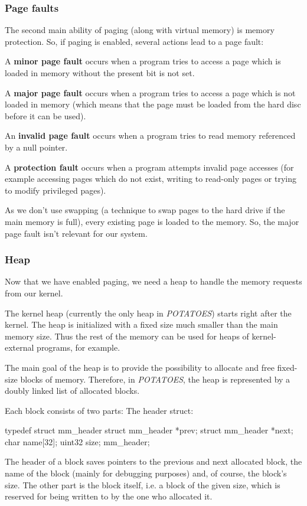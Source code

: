 \documentclass[11pt,a4paper]{scrartcl}
\begin{document}
\subsubsection{Page faults}
The second main ability of paging (along with virtual memory) is memory protection. So, if paging is enabled, several actions lead to a page fault:
\begin{list}{}{}
\item A \textbf{minor page fault} occurs when a program tries to access a page which is loaded in memory without the present bit is not set.
\item A \textbf{major page fault} occurs when a program tries to access a page which is not loaded in memory (which means that the page must be loaded from the hard disc before it can be used).
\item An \textbf{invalid page fault} occurs when a program tries to read memory referenced by a null pointer.
\item A \textbf{protection fault} occurs when a program attempts invalid page accesses (for example accessing pages which do not exist, writing to read-only pages or trying to modify privileged pages).
\end{list}
As we don't use swapping (a technique to swap pages to the hard drive if the main memory is full), every existing page is loaded to the memory. So, the major page fault isn't relevant for our system.
\subsubsection{Heap}
Now that we have enabled paging, we need a heap to handle the memory requests from our kernel.

The kernel heap (currently the only heap in \textit{POTATOES}) starts right after the kernel. The heap is initialized with a fixed size much smaller than the main memory size. Thus the rest of the memory can be used for heaps of kernel-external programs, for example.

The main goal of the heap is to provide the possibility to allocate and free fixed-size blocks of memory.
Therefore, in \textit{POTATOES}, the heap is represented by a doubly linked list of allocated blocks.

Each block consists of two parts:
The header struct:
\begin{code}[kernel/mm/mm.h]
typedef struct mm_header {
	struct mm_header *prev;
	struct mm_header *next;
	char name[32];
	uint32 size;
} mm_header;
\end{code}
The header of a block saves pointers to the previous and next allocated block, the name of the block (mainly for debugging purposes) and, of course, the block's size.
The other part is the block itself, i.e. a block of the given size, which is reserved for being written to by the one who allocated it.
\end{document}
